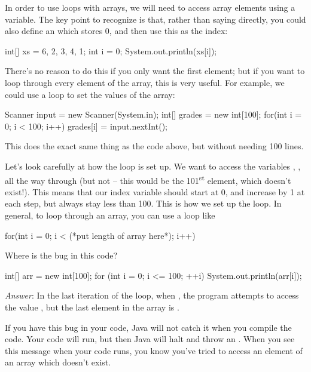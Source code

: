 In order to use loops with arrays, we will need to access array elements using a variable. The key point to recognize is that, rather than saying  directly, you could also define an  which stores 0, and then use this  as the index:
\begin{code}
int[] xs = {6, 2, 3, 4, 1};
int i = 0;
System.out.println(xs[i]);
\end{code}
There's no reason to do this if you only want the first element; but if you want to loop through every element of the array, this is very useful. For example, we could use a  loop to set the values of the  array:
\begin{code}
Scanner input = new Scanner(System.in);
int[] grades = new int[100];
for(int i = 0; i < 100; i++) {
    grades[i] = input.nextInt();
}
\end{code}
This does the exact same thing as the code above, but without needing 100 lines.

Let's look carefully at how the  loop is set up. We want to access the variables , , all the way through  (but not  -- this would be the 101\textsuperscript{st} element, which doesn't exist!). This means that our index variable  should start at 0, and increase by 1 at each step, but always stay less than 100. This is how we set up the  loop. In general, to loop through an array, you can use a loop like
\begin{code}
for(int i = 0; i < (*put length of array here*); i++)
\end{code}

\begin{example}Where is the bug in this code?
\begin{code}
int[] arr = new int[100]; 
for (int i = 0; i <= 100; ++i) {
    System.out.println(arr[i]);
}
\end{code}
\noindent \emph{Answer}:
In the last iteration of the loop, when , the program attempts to access the value , but the last element in the array is .

If you have this bug in your code, Java will not catch it when you compile the code. Your code will run, but then Java will halt and throw an . When you see this message when your code runs, you know you've tried to access an element of an array which doesn't exist.
\end{example}

